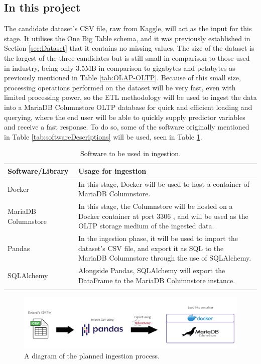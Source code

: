 \documentclass[12pt]{report}
\begin{document}
\subsection{In this project}
The candidate dataset's CSV file, raw from Kaggle, will act as the input for this stage. It utilises the One Big Table schema, 
and it was previously established in Section \ref{sec:Dataset} that it contains no missing values. 
The size of the dataset is the largest of the three candidates but is still
small in comparison to those used in industry, being only 3.5MB in comparison to gigabytes and petabytes as previously 
mentioned in Table \ref{tab:OLAP-OLTP}. Because of this small size, processing operations performed on the dataset 
will be very fast, even with limited processing power, so the ETL methodology will be used to ingest the data 
into a MariaDB Columnstore OLTP database for quick and efficient loading and querying, where the end user will be 
able to quickly supply predictor variables and receive a fast response. To do so, 
some of the software originally mentioned in Table \ref{tab:softwareDescriptions} will be used, seen in Table \ref{tab:IngestionSoftware}.

\pagebreak %


\begin{longtable}{ |p{}| p{}|}
    \hline
    \cellcolor{blue!25}Software/Library & \cellcolor{blue!25}Usage for ingestion\\
    \hline
    Docker &
    In this stage, Docker will be used to host a container of MariaDB Columnstore.\\
    \hline
    MariaDB Columnstore &
    In this stage, the Columnstore will be hosted on a Docker container at port 3306 \autocite{docker_hub_mariadbcolumnstore_nodate}, 
    and will be used as the OLTP storage medium of the ingested data.\\
    \hline 
    Pandas &
    In the ingestion phase, it will be used to import the dataset's CSV file, and export it as SQL to 
    the MariaDB Columnstore through the use of SQLAlchemy.\\
    \hline
    SQLAlchemy &
    Alongside Pandas, SQLAlchemy will export the DataFrame to the MariaDB Columnstore instance.\\
    \hline
\caption{Software to be used in ingestion.}\label{tab:IngestionSoftware}
\end{longtable}

\begin{figure}[H]
    \centering
    \includegraphics[width=.9\linewidth]{diagrams/Ingestion.png}
    \caption{A diagram of the planned ingestion process.}
    \label{fig:IngestionDiagram}
\end{figure}
\end{document}
